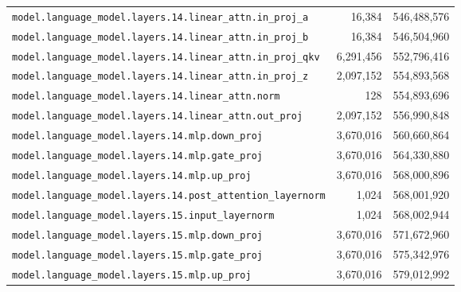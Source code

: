 \documentclass[10pt,a4paper]{article}
\theoremstyle{definition}
\begin{document}
\begin{appendices}
\begin{longtable}{p{9.5cm}rr}
\texttt{model.\allowbreak{}language\_model.\allowbreak{}layers.\allowbreak{}14.\allowbreak{}linear\_attn.\allowbreak{}in\_proj\_a} & 16,384 & 546,488,576 \\
\texttt{model.\allowbreak{}language\_model.\allowbreak{}layers.\allowbreak{}14.\allowbreak{}linear\_attn.\allowbreak{}in\_proj\_b} & 16,384 & 546,504,960 \\
\texttt{model.\allowbreak{}language\_model.\allowbreak{}layers.\allowbreak{}14.\allowbreak{}linear\_attn.\allowbreak{}in\_proj\_qkv} & 6,291,456 & 552,796,416 \\
\texttt{model.\allowbreak{}language\_model.\allowbreak{}layers.\allowbreak{}14.\allowbreak{}linear\_attn.\allowbreak{}in\_proj\_z} & 2,097,152 & 554,893,568 \\
\texttt{model.\allowbreak{}language\_model.\allowbreak{}layers.\allowbreak{}14.\allowbreak{}linear\_attn.\allowbreak{}norm} & 128 & 554,893,696 \\
\texttt{model.\allowbreak{}language\_model.\allowbreak{}layers.\allowbreak{}14.\allowbreak{}linear\_attn.\allowbreak{}out\_proj} & 2,097,152 & 556,990,848 \\
\texttt{model.\allowbreak{}language\_model.\allowbreak{}layers.\allowbreak{}14.\allowbreak{}mlp.\allowbreak{}down\_proj} & 3,670,016 & 560,660,864 \\
\texttt{model.\allowbreak{}language\_model.\allowbreak{}layers.\allowbreak{}14.\allowbreak{}mlp.\allowbreak{}gate\_proj} & 3,670,016 & 564,330,880 \\
\texttt{model.\allowbreak{}language\_model.\allowbreak{}layers.\allowbreak{}14.\allowbreak{}mlp.\allowbreak{}up\_proj} & 3,670,016 & 568,000,896 \\
\texttt{model.\allowbreak{}language\_model.\allowbreak{}layers.\allowbreak{}14.\allowbreak{}post\_attention\_layernorm} & 1,024 & 568,001,920 \\
\texttt{model.\allowbreak{}language\_model.\allowbreak{}layers.\allowbreak{}15.\allowbreak{}input\_layernorm} & 1,024 & 568,002,944 \\
\texttt{model.\allowbreak{}language\_model.\allowbreak{}layers.\allowbreak{}15.\allowbreak{}mlp.\allowbreak{}down\_proj} & 3,670,016 & 571,672,960 \\
\texttt{model.\allowbreak{}language\_model.\allowbreak{}layers.\allowbreak{}15.\allowbreak{}mlp.\allowbreak{}gate\_proj} & 3,670,016 & 575,342,976 \\
\texttt{model.\allowbreak{}language\_model.\allowbreak{}layers.\allowbreak{}15.\allowbreak{}mlp.\allowbreak{}up\_proj} & 3,670,016 & 579,012,992 \\

\end{longtable}
\end{appendices}
\end{document}
